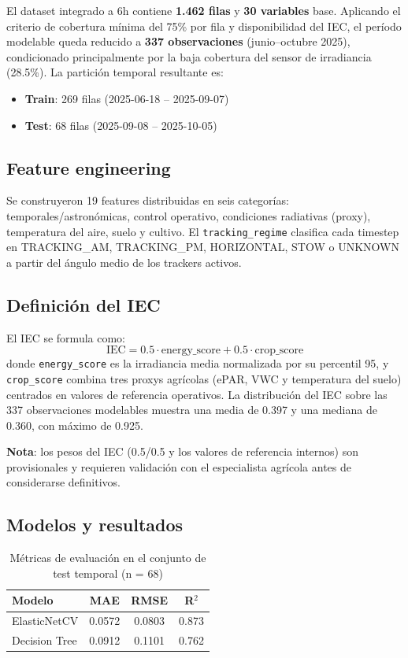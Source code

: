 \documentclass[12pt,a4paper]{article}
\begin{document}
El dataset integrado a 6h contiene \textbf{1.462 filas} y \textbf{30 variables} base. Aplicando el criterio de cobertura mínima del 75\% por fila y disponibilidad del IEC, el período modelable queda reducido a \textbf{337 observaciones} (junio--octubre 2025), condicionado principalmente por la baja cobertura del sensor de irradiancia (28.5\%). La partición temporal resultante es:

\begin{itemize}[noitemsep]
  \item \textbf{Train}: 269 filas (2025-06-18 -- 2025-09-07)
  \item \textbf{Test}: 68 filas (2025-09-08 -- 2025-10-05)
\end{itemize}

\subsection{Feature engineering}

Se construyeron 19 features distribuidas en seis categorías: temporales/astronómicas, control operativo, condiciones radiativas (proxy), temperatura del aire, suelo y cultivo. El \texttt{tracking\_regime} clasifica cada timestep en TRACKING\_AM, TRACKING\_PM, HORIZONTAL, STOW o UNKNOWN a partir del ángulo medio de los trackers activos.

\subsection{Definición del IEC}

El IEC se formula como:
\[
  \text{IEC} = 0.5 \cdot \text{energy\_score} + 0.5 \cdot \text{crop\_score}
\]
donde \texttt{energy\_score} es la irradiancia media normalizada por su percentil 95, y \texttt{crop\_score} combina tres proxys agrícolas (ePAR, VWC y temperatura del suelo) centrados en valores de referencia operativos. La distribución del IEC sobre las 337 observaciones modelables muestra una media de 0.397 y una mediana de 0.360, con máximo de 0.925.

\textbf{Nota}: los pesos del IEC (0.5/0.5 y los valores de referencia internos) son provisionales y requieren validación con el especialista agrícola antes de considerarse definitivos.

\subsection{Modelos y resultados}

\begin{table}[H]
\centering
\caption{Métricas de evaluación en el conjunto de test temporal (n = 68)}
\label{tab:metricas_s2}
\renewcommand{\arraystretch}{1.3}
\begin{tabular}{lccc}
\toprule
\textbf{Modelo} & \textbf{MAE} & \textbf{RMSE} & \textbf{R$^2$} \\
\midrule
ElasticNetCV    & 0.0572 & 0.0803 & 0.873 \\
Decision Tree   & 0.0912 & 0.1101 & 0.762 \\
\bottomrule
\end{tabular}
\end{table}
\end{document}
